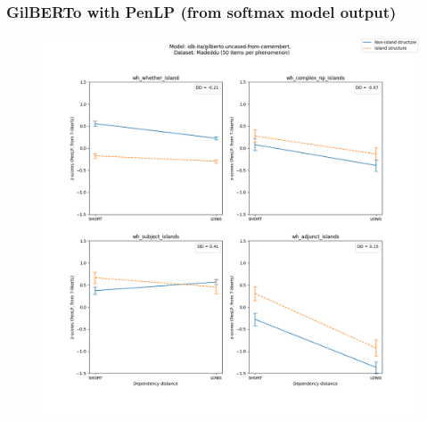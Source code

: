 \subsubsection{GilBERTo with PenLP (from softmax model output)}
\begin{figure}[h]
	\centering
	\includegraphics[width=1\textwidth]{images/AppendixA/Madeddu_wh_idb-ita_gilberto-uncased-from-camembert_PenLP-zscores-likert-2022-07-11.png} 
\end{figure}

\clearpage
